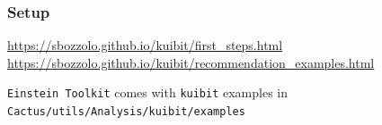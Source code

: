 \documentclass[compress, aspectratio=169]{beamer}
\begin{document}
\begin{frame}
  \frametitle{Setup}
  \centering
  \url{https://sbozzolo.github.io/kuibit/first_steps.html}
  \url{https://sbozzolo.github.io/kuibit/recommendation_examples.html}

  \texttt{Einstein Toolkit} comes with \texttt{kuibit} examples in \texttt{Cactus/utils/Analysis/kuibit/examples}

\end{frame}
\end{document}

